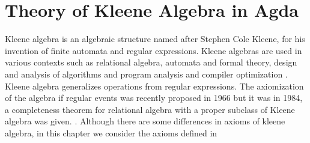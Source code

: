 \chapter{Theory of Kleene Algebra in Agda}
Kleene algebra is an algebraic structure named after Stephen Cole Kleene, for
his invention of finite automata and regular expressions. Kleene algebras are
used in various contexts such as relational algebra, automata and formal theory,
design and analysis of algorithms and program analysis and compiler optimization
\cite{kozen1997kleene}. Kleene algebra generalizes operations from regular
expressions. The axiomization of the algebra if regular events was recently
proposed in 1966 but it was in 1984, a completeness theorem for relational
algebra with a proper subclass of Kleene algebra was given.
\cite{kozen1994completeness}. Although there are some differences in axioms of
kleene algebra, in this chapter we consider the axioms defined in
\cite{kozen1994completeness}

